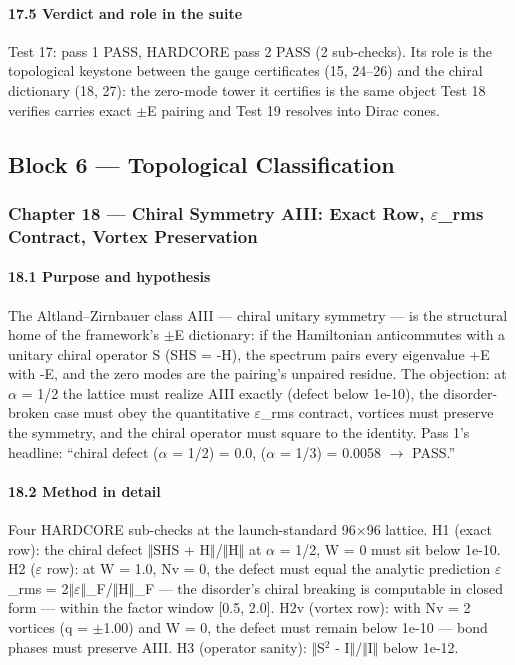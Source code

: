 \documentclass[10pt]{article}
\begin{document}
\paragraph{17.5 Verdict and role in the suite}

Test 17: pass 1 PASS, HARDCORE pass 2 PASS (2 sub-checks). Its role is the topological keystone between the gauge certificates (15, 24--26) and the chiral dictionary (18, 27): the zero-mode tower it certifies is the same object Test 18 verifies carries exact $\pm$E pairing and Test 19 resolves into Dirac cones.

\subsection{Block 6 --- Topological Classification}

\subsubsection{Chapter 18 --- Chiral Symmetry AIII: Exact Row, $\varepsilon$\_rms Contract, Vortex Preservation}

\paragraph{18.1 Purpose and hypothesis}

The Altland--Zirnbauer class AIII --- chiral unitary symmetry --- is the structural home of the framework's $\pm$E dictionary: if the Hamiltonian anticommutes with a unitary chiral operator S (SHS = -H), the spectrum pairs every eigenvalue +E with -E, and the zero modes are the pairing's unpaired residue. The objection: at $\alpha$ = 1/2 the lattice must realize AIII exactly (defect below 1e-10), the disorder-broken case must obey the quantitative $\varepsilon$\_rms contract, vortices must preserve the symmetry, and the chiral operator must square to the identity. Pass 1's headline: ``chiral defect ($\alpha$ = 1/2) = 0.0, ($\alpha$ = 1/3) = 0.0058 $\rightarrow$ PASS.''

\paragraph{18.2 Method in detail}

Four HARDCORE sub-checks at the launch-standard 96$\times$96 lattice. H1 (exact row): the chiral defect $\Vert$SHS + H$\Vert$/$\Vert$H$\Vert$ at $\alpha$ = 1/2, W = 0 must sit below 1e-10. H2 ($\varepsilon$ row): at W = 1.0, Nv = 0, the defect must equal the analytic prediction $\varepsilon$\_rms = 2$\Vert$$\varepsilon$$\Vert$\_F/$\Vert$H$\Vert$\_F --- the disorder's chiral breaking is computable in closed form --- within the factor window [0.5, 2.0]. H2v (vortex row): with Nv = 2 vortices (q = $\pm$1.00) and W = 0, the defect must remain below 1e-10 --- bond phases must preserve AIII. H3 (operator sanity): $\Vert$S$^2$ - I$\Vert$/$\Vert$I$\Vert$ below 1e-12.
\end{document}
